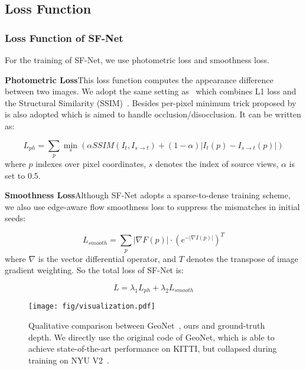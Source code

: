 \documentclass[10pt,twocolumn,letterpaper]{article}
\begin{document}
\subsection{Loss Function}

\subsubsection{Loss Function of SF-Net}

\quad For the training of SF-Net, we use photometric loss and smoothness loss.

\textbf{Photometric Loss}\quad This loss function computes the appearance difference between two images. We adopt the same setting as~\cite{godard2017unsupervised} which combines L1 loss and the Structural Similarity (SSIM)~\cite{wang2004image}. Besides per-pixel minimum trick proposed by~\cite{godard2018digging} is also adopted which is aimed to handle occlusion/disocclusion. It can be written as:

\begin{equation}
    L_{ph}= \sum_{p}\min_{s}(\alpha SSIM(I_t,I_{s\xrightarrow{}t})+(1-\alpha)|I_t(p) - I_{s\xrightarrow{}t}(p)|)
    \label{equ:lSSMI2}
\end{equation}
where $p$ indexes over pixel coordinates, $s$ denotes the index of source views, $\alpha$ is set to 0.5. 



\textbf{Smoothness Loss}\quad Although SF-Net adopts a sparse-to-dense training scheme, we also use edge-aware
flow smoothness loss to suppress the mismatches in initial seeds:

\begin{equation}
    L_{smooth}=\sum_{p}{\left|{\nabla}F(p)\right|\cdot \left(e^{-\left|{\nabla}I(p)\right|}\right)^T}
    \label{equ:lsmooth}
\end{equation}
where $\nabla$ is the vector differential operator, and $T$ denotes the transpose of image gradient weighting. So the total loss of SF-Net is:

\begin{equation}
    L=\lambda_{1}L_{ph}+\lambda_{2}L_{smooth}
\end{equation}

\begin{figure*}
\begin{center}
  \texttt{[image: fig/visualization.pdf]}
\end{center}
   \vspace{-3mm}
   \caption{Qualitative comparison between GeoNet~\cite{yin2018geonet}, ours and ground-truth depth. We directly use the original code of GeoNet, which is able to achieve state-of-the-art performance on KITTI, but collapsed during training on NYU V2~\cite{silberman2012indoor}.}
   \vspace{-3mm}
\label{fig:nyu_depth}
\end{figure*}
\end{document}
